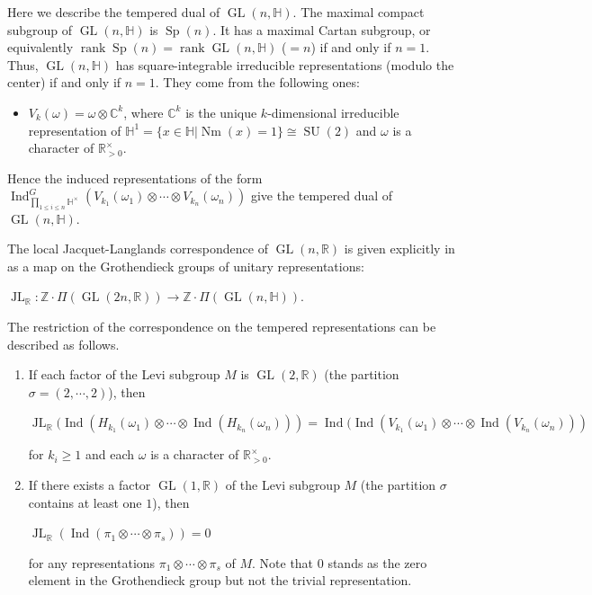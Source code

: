 \documentclass[11pt]{article}
\theoremstyle{plain}
\theoremstyle{remark}
\theoremstyle{definition}
\DeclareMathOperator{\Nm}{Nm}
\DeclareMathOperator{\Ind}{Ind}
\DeclareMathOperator{\GL}{GL}
\DeclareMathOperator{\JL}{JL}
\DeclareMathOperator{\SU}{SU}
\DeclareMathOperator{\Sp}{Sp}
\DeclareMathOperator{\rk}{rank}
\begin{document}
Here we describe the tempered dual of $\GL(n,\mathbb{H})$. 
The maximal compact subgroup of $\GL(n,\mathbb{H})$ is $\Sp(n)$. 
It has a maximal Cartan subgroup, or equivalently $\rk \Sp(n)=\rk \GL(n,\mathbb{H})$ ($=n$) if and only if $n=1$.
Thus, $\GL(n,\mathbb{H})$ has square-integrable irreducible representations (modulo the center) if and only if $n=1$. 
They come from the following ones:
\begin{itemize}
    \item $V_k(\omega)=\omega\otimes \mathbb{C}^k$, where  $\mathbb{C}^k$ is the unique $k$-dimensional irreducible representation of $\mathbb{H}^1=\{x\in \mathbb{H}|\Nm(x)=1\}\cong\SU(2)$ and $\omega$ is a character of $\mathbb{R}_{>0}^{\times}$. 
\end{itemize}
Hence the induced representations of the form $\Ind^{G}_{\prod_{1\leq i\leq n}\mathbb{H}^{\times}}(V_{k_1}(\omega_1)\otimes \cdots \otimes V_{k_n}(\omega_n))$ give the  tempered dual of $\GL(n,\mathbb{H})$. 


The local Jacquet-Langlands correspondence of $\GL(n,\mathbb{R})$ is given explicitly in \cite[\S 13]{BaduRena10} as a map on the Grothendieck groups of unitary representations: 
\begin{center}
    $\JL_{\mathbb{R}}\colon \mathbb{Z}\cdot\Pi({\GL(2n,\mathbb{R})})\to \mathbb{Z}\cdot\Pi(\GL(n,\mathbb{H}))$. 
\end{center}
The restriction of the correspondence on the tempered representations can be described as follows. 
\begin{enumerate}
    \item If each factor of the Levi subgroup $M$ is $\GL(2,\mathbb{R})$ (the partition $\sigma=(2,\cdots,2)$), then
    \begin{center}
        $\JL_{\mathbb{R}}(\Ind(H_{k_1}(\omega_1)\otimes\cdots \otimes \Ind(H_{k_n}(\omega_n)))=\Ind(\Ind(V_{k_1}(\omega_1)\otimes\cdots \otimes \Ind(V_{k_n}(\omega_n)))$
    \end{center}
    for $k_i\geq 1$ and each $\omega$ is a character of $\mathbb{R}_{>0}^{\times}$. 
    \item If there exists a factor $\GL(1,\mathbb{R})$ of the Levi subgroup $M$ (the partition $\sigma$ contains at least one $1$), then
\begin{center}
$\JL_{\mathbb{R}}(\Ind(\pi_1\otimes\cdots\otimes \pi_s))=0$
\end{center}
for any representations 
$\pi_1\otimes\cdots\otimes \pi_s$ of $M$. 
Note that $0$ stands as the zero element in the Grothendieck group but not the trivial representation. 
\end{enumerate}
\end{document}
